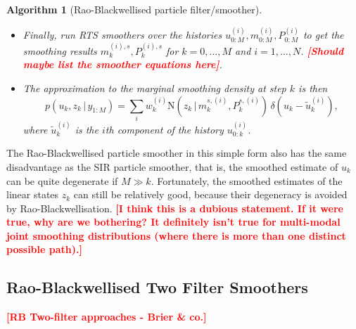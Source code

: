 \documentclass[twocolumn]{autart}    %
\newcommand{\comment}[1]{\textcolor{red}{\textbf{[#1]}}}
\newtheorem{algo}{Algorithm}[section]
\begin{document}
\begin{algo}[Rao-Blackwellised particle filter/smoother]
\begin{itemize}
\begin{enumerate}
\item Compute importance weights as follows:
  \begin{equation}
    w_k^{(i)} \propto w_{k-1}^{(i)}
     \frac{p(u_{k}^{(i)} \, | \, u_{k-1}^{(i)}) \,
          \mathrm{N}(y_k \, | \, \mu_k^{(i)},S_k^{(i)})}
          {q(u_{k}^{(i)} \, | \, u_{0:k-1}^{(i)},y_{1:k})}. \\
  \end{equation}

\item Resample the set of histories $\{
  w_k^{(i)},u_{0:k}^{(i)},m_{0:k}^{(i)},P_{0:k}^{(i)}~:~i=1,\ldots,N
  \}$ if needed.
\end{enumerate}

\item Finally, run RTS smoothers over the histories $u_{0:M}^{(i)}, m_{0:M}^{(i)}, P_{0:M}^{(i)}$
  to get the smoothing results $m_k^{(i),s},P_k^{(i),s}$ for $k=0,\ldots,M$ and $i=1,\ldots,N$.
  \comment{Should maybe list the smoother equations here}.

\item The approximation to the marginal smoothing density at step $k$
  is then
%
\begin{equation}
  p(u_k,z_k\,|\,y_{1:M})
  = \sum_i w_k^{(i)} \mathrm{N}(z_k\,|\,m_k^{s,(i)},P_k^{s,(i)}) \,
  \delta(u_k - \tilde{u}_k^{(i)}),
\nonumber
\end{equation}
%
where $\tilde{u}_k^{(i)}$ is the $i$th component of the history
$u_{0:k}^{(i)}$.
\end{itemize}
\end{algo}
%
The Rao-Blackwellised particle smoother in this simple form also has the same disadvantage as the SIR particle smoother, that is, the smoothed estimate of $u_{k}$ can be quite degenerate if $M \gg k$. Fortunately, the smoothed estimates of the linear states $z_k$ can still be relatively good, because their degeneracy is avoided by Rao-Blackwellisation. \comment{I think this is a dubious statement. If it were true, why are we bothering? It definitely isn't true for multi-modal joint smoothing distributions (where there is more than one distinct possible path).}


\subsection{Rao-Blackwellised Two Filter Smoothers}

\comment{RB Two-filter approaches - Brier \& co.}
\end{document}
